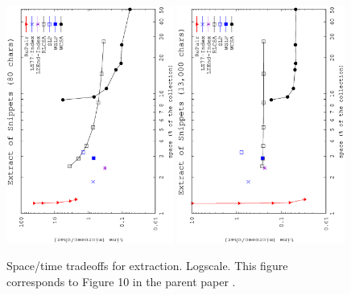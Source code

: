 \documentclass[review]{elsarticle}
\begin{document}
\begin{figure}[t]
\begin{center}
\includegraphics[angle=-90,width=0.49\textwidth]{../figures/f5/length80/extract80.eps}
\includegraphics[angle=-90,width=0.49\textwidth]{../figures/f5/length13000/extract13000.eps}
\caption{Space/time tradeoffs for extraction. Logscale. This figure corresponds to Figure 10 in the parent paper \cite{CFMNis16.3}.}
\label{fig:extract}
\end{center}
\end{figure}
\end{document}
